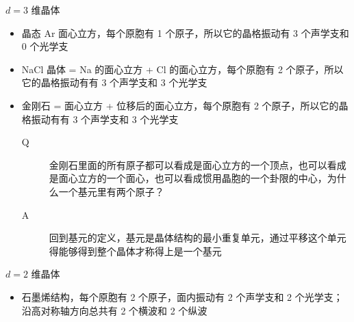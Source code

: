 \begin{framed}
    $d = 3$ 维晶体
    \begin{itemize}
        \item 晶态 Ar 面心立方，每个原胞有 1 个原子，所以它的晶格振动有 3 个声学支和 0 个光学支
        \item NaCl 晶体 = Na 的面心立方 + Cl 的面心立方，每个原胞有 2 个原子，所以它的晶格振动有有 3 个声学支和 3 个光学支
        \item 金刚石 = 面心立方 + 位移后的面心立方，每个原胞有 2 个原子，所以它的晶格振动有有 3 个声学支和 3 个光学支\begin{description}
                  \item[Q] 金刚石里面的所有原子都可以看成是面心立方的一个顶点，也可以看成是面心立方的一个面心，也可以看成惯用晶胞的一个卦限的中心，为什么一个基元里有两个原子？
                  \item[A] 回到基元的定义，基元是晶体结构的最小重复单元，通过平移这个单元得能够得到整个晶体才称得上是一个基元
              \end{description}
    \end{itemize}

    $d = 2$ 维晶体
    \begin{itemize}
        \item 石墨烯结构，每个原胞有 2 个原子，面内振动有 2 个声学支和 2 个光学支；沿高对称轴方向总共有 2 个横波和 2 个纵波
    \end{itemize}
\end{framed}

